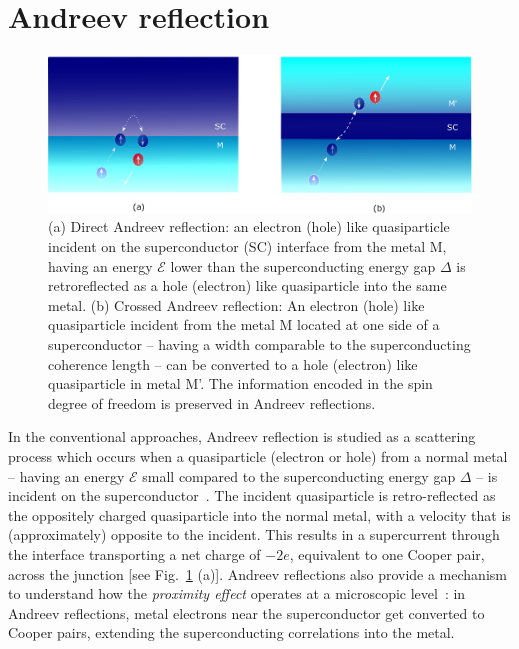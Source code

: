 \documentclass[12pt,letterpaper,aps,onecolumn,superscriptaddress,floatfix,notitlepage]{revtex4-1}
\begin{document}
	\section{Andreev reflection\label{sec2}} 
	\begin{figure}
		\includegraphics[scale=0.34]{fig2.eps}
		\caption{(a) Direct Andreev reflection: an electron (hole) like quasiparticle incident on the superconductor (SC) interface from the metal M, having an energy $\mathcal{E}$ lower than the superconducting energy gap $\Delta$ is retroreflected as a hole (electron) like quasiparticle into the same metal. (b) Crossed Andreev reflection: An electron (hole) like quasiparticle incident from the metal M located at one side of a superconductor -- having a width comparable to the superconducting coherence length -- can be converted to a hole (electron) like quasiparticle in metal M'. The information encoded in the spin degree of freedom is preserved in Andreev reflections.\label{dca}}
	\end{figure} 
	In the conventional approaches, Andreev reflection is studied as a scattering process which occurs when a quasiparticle (electron or hole) from a normal metal -- having an energy $\mathcal{E}$ small compared to the superconducting energy gap $\Delta$ -- is incident on the superconductor~\cite{andreev,Pannet,spintron,artemenko1978excess,artemenko1979theory,artemenko1979excess,zaitsev1980theory}. The incident quasiparticle is retro-reflected as the oppositely charged quasiparticle into the normal metal, with a velocity that is (approximately) opposite to the incident. This results in a supercurrent through the interface transporting a net charge of $-2e$, equivalent to one Cooper pair, across the junction [see Fig.~\ref{dca} (a)].
	Andreev reflections also provide a mechanism to understand how the \textit{proximity effect} operates at a microscopic level~\cite{Pannet,proximity2004}: in Andreev reflections, metal electrons near the superconductor get converted to Cooper pairs, extending the superconducting correlations into the metal.
	
\end{document}
